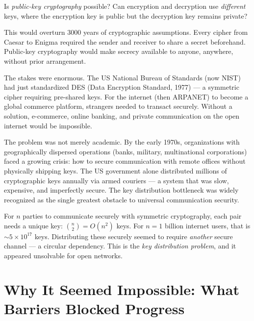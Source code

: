 Is \emph{public-key cryptography} possible? Can encryption and decryption use \emph{different} keys, where the encryption key is public but the decryption key remains private?

This would overturn 3000 years of cryptographic assumptions. Every cipher from Caesar to Enigma required the sender and receiver to share a secret beforehand. Public-key cryptography would make secrecy available to anyone, anywhere, without prior arrangement.

The stakes were enormous. The US National Bureau of Standards (now NIST) had just standardized DES (Data Encryption Standard, 1977) — a symmetric cipher requiring pre-shared keys. For the internet (then ARPANET) to become a global commerce platform, strangers needed to transact securely. Without a solution, e-commerce, online banking, and private communication on the open internet would be impossible.

The problem was not merely academic. By the early 1970s, organizations with geographically dispersed operations (banks, military, multinational corporations) faced a growing crisis: how to secure communication with remote offices without physically shipping keys. The US government alone distributed millions of cryptographic keys annually via armed couriers — a system that was slow, expensive, and imperfectly secure. The key distribution bottleneck was widely recognized as the single greatest obstacle to universal communication security.

For $n$ parties to communicate securely with symmetric cryptography, each pair needs a unique key: $\binom{n}{2} = O(n^2)$ keys. For $n = 1$ billion internet users, that is $\sim 5 \times 10^{17}$ keys. Distributing these securely seemed to require \emph{another} secure channel — a circular dependency. This is the \emph{key distribution problem}, and it appeared unsolvable for open networks.

\section{Why It Seemed Impossible: What Barriers Blocked Progress}
\label{sec:crypto:impossible}

